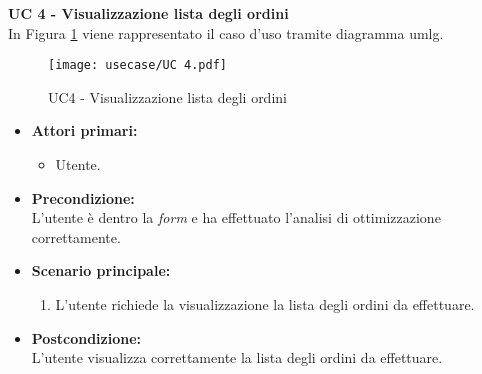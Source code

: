 \noindent \textbf{\large UC 4 - Visualizzazione lista degli ordini}\\[0.2cm]
\label{uc:visualizzazione-lista-ordini}
\noindent In Figura \ref{use-case-4} viene rappresentato il caso d'uso tramite diagramma \gls{umlg}.
\begin{figure}[!h] 
    \centering 
    \texttt{[image: usecase/UC 4.pdf]} 
    \caption{UC4 - Visualizzazione lista degli ordini}
	\label{use-case-4}
\end{figure}
\begin{itemize}

	\item \textbf{Attori primari: }
		\begin{itemize}
			\item Utente.
		\end{itemize}

	\item \textbf{Precondizione: }\\[0.3cm]
		L'utente è dentro la \textit{form} e ha effettuato l'analisi di ottimizzazione correttamente.

	\item \textbf{Scenario principale: }
		\begin{enumerate}
			\item L'utente richiede la visualizzazione la lista degli ordini da effettuare.
		\end{enumerate}
		

	\item \textbf{Postcondizione: }\\[0.3cm]
		L'utente visualizza correttamente la lista degli ordini da effettuare.

\end{itemize}

\vspace{0.4cm}

\vspace*{\fill}

